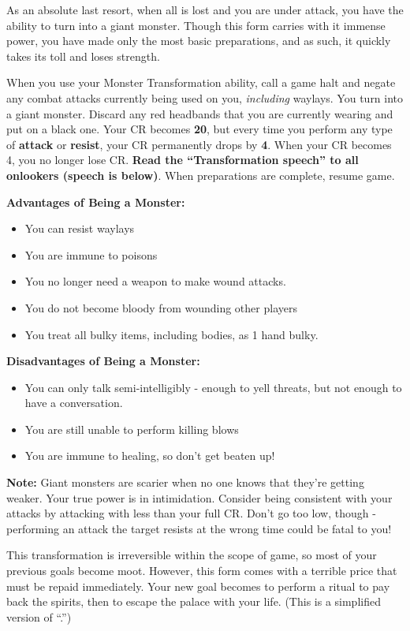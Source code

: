 \documentclass[green]{NeptuneBall}
\begin{document}
\name{\gMonsterTransformation{}}

As an absolute last resort, when all is lost and you are under attack, you have the ability to turn into a giant monster. Though this form carries with it immense power, you have made only the most basic preparations, and as such, it quickly takes its toll and loses strength.

When you use your Monster Transformation ability, call a game halt and negate any combat attacks currently being used on you, \emph{including} waylays. You turn into a giant monster. Discard any red headbands that you are currently wearing and put on a black one. Your CR becomes {\bf 20}, but every time you perform any type of {\bf attack} or {\bf resist}, your CR permanently drops by {\bf 4}. When your CR becomes 4, you no longer lose CR. {\bf Read the ``Transformation speech'' to all onlookers (speech is below)}. When preparations are complete, resume game.

{\bf Advantages of Being a Monster:}
\begin{itemize}
\item You can resist waylays
\item You are immune to poisons
\item You no longer need a weapon to make wound attacks.
\item You do not become bloody from wounding other players
\item You treat all bulky items, including bodies, as 1 hand bulky.
\end{itemize}

{\bf Disadvantages of Being a Monster:}
\begin{itemize}
\item You can only talk semi-intelligibly - enough to yell threats, but not enough to have a conversation.
\item You are still unable to perform killing blows
\item You are immune to healing, so don't get beaten up!
\end{itemize}

{\bf Note:} Giant monsters are scarier when no one knows that they're getting weaker. Your true power is in intimidation. Consider being consistent with your attacks by attacking with less than your full CR. Don't go too low, though - performing an attack the target resists at the wrong time could be fatal to you! 

This transformation is irreversible within the scope of game, so most of your previous goals become moot. However, this form comes with a terrible price that must be repaid immediately. Your new goal becomes to perform a ritual to pay back the spirits, then to escape the palace with your life. (This is a simplified version of ``\gRitual{}.'')
\end{document}
